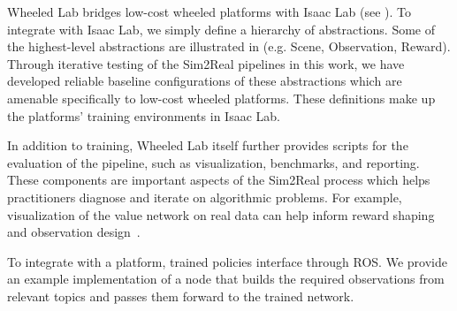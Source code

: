 Wheeled Lab bridges low-cost wheeled platforms with Isaac Lab (see ). To integrate with Isaac Lab, we simply define a hierarchy of abstractions. Some of the highest-level abstractions are illustrated in  (e.g. Scene, Observation, Reward). Through iterative testing of the Sim2Real pipelines in this work, we have developed reliable baseline configurations of these abstractions which are amenable specifically to low-cost wheeled platforms. These definitions make up the platforms' training environments in Isaac Lab.

In addition to training, Wheeled Lab itself further provides scripts for the evaluation of the pipeline, such as visualization, benchmarks, and reporting. These components are important aspects of the Sim2Real process which helps practitioners diagnose and iterate on algorithmic problems. For example, visualization of the value network on real data can help inform reward shaping and observation design~\cite{stachowicz_fastrlap_2023}.

To integrate with a platform, trained policies interface through ROS. We provide an example implementation of a node that builds the required observations from relevant topics and passes them forward to the trained network.
